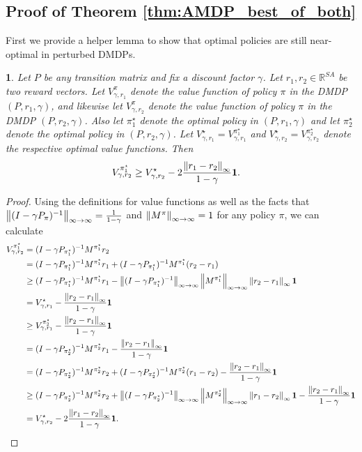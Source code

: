 \documentclass{article}
\theoremstyle{plain}
\theoremstyle{plain}
\newtheorem{lem}[thm]{\protect\lemmaname}
\theoremstyle{remark}
\theoremstyle{plain}
\theoremstyle{plain}
\providecommand{\lemmaname}{Lemma}
\newcommand{\R}{\mathbb{R}}
\newcommand{\pistar}{\pi^\star}
\newcommand{\one}{\mathbf{1}}
\begin{document}
\subsection{Proof of Theorem \ref{thm:AMDP_best_of_both}}
\label{sec:AMDP_best_of_both_pf}

First we provide a helper lemma to show that optimal policies are still near-optimal in perturbed DMDPs.
\begin{lem}
\label{lem:pert_near_optimality}
    Let $P$ be any transition matrix and fix a discount factor $\gamma$. Let $r_1, r_2 \in \R^{SA}$ be two reward vectors. Let $V_{\gamma, r_1}^\pi$ denote the value function of policy $\pi$ in the DMDP $(P, r_1, \gamma)$, and likewise let $V_{\gamma, r_2}^\pi$ denote the value function of policy $\pi$ in the DMDP $(P, r_2, \gamma)$. Also let $\pistar_1$ denote the optimal policy in $(P, r_1, \gamma)$ and let $\pistar_2$ denote the optimal policy in $(P, r_2, \gamma)$. Let $V_{\gamma, r_1}^\star = V_{\gamma, r_1}^{\pistar_1}$ and $V_{\gamma, r_2}^\star = V_{\gamma, r_2}^{\pistar_2}$ denote the respective optimal value functions. Then
    \begin{align*}
        V_{\gamma, r_2}^{\pistar_1} & \geq V_{\gamma, r_2}^{\star} - 2\frac{\infnorm{r_1 - r_2}}{1-\gamma} \one.
    \end{align*}
\end{lem}
\begin{proof}
Using the definitions for value functions as well as the facts that $\left\Vert (I - \gamma P_\pi)^{-1}\right\Vert _{\infty \to \infty} = \frac{1}{1-\gamma}$ and $\left\Vert M^\pi\right\Vert _{\infty \to \infty} = 1$ for any policy $\pi$, we can calculate
    \begin{align*}
        V_{\gamma, r_2}^{\pistar_1} &= (I - \gamma P_{\pistar_1})^{-1} M^{\pistar_1} r_2 \\
        &= (I - \gamma P_{\pistar_1})^{-1} M^{\pistar_1} r_1 + (I - \gamma P_{\pistar_1})^{-1} M^{\pistar_1} (r_2 - r_1) \\
        & \geq (I - \gamma P_{\pistar_1})^{-1} M^{\pistar_1} r_1 - \infinfnorm{(I - \gamma P_{\pistar_1})^{-1}} \infinfnorm{M^{\pistar_1}} \infnorm{ r_2 - r_1} \one \\
        &= V_{\gamma, r_1}^\star - \frac{\infnorm{r_2 - r_1}}{1-\gamma}\one \\
        & \geq V_{\gamma, r_1}^{\pistar_2} - \frac{\infnorm{r_2 - r_1}}{1-\gamma} \one \\
        & = (I - \gamma P_{\pistar_2})^{-1} M^{\pistar_2} r_1 - \frac{\infnorm{r_2 - r_1}}{1-\gamma} \one \\
        & = (I - \gamma P_{\pistar_2})^{-1} M^{\pistar_2} r_2 + (I - \gamma P_{\pistar_2})^{-1} M^{\pistar_2} (r_1 - r_2) - \frac{\infnorm{r_2 - r_1}}{1-\gamma} \one \\ 
        & \geq  (I - \gamma P_{\pistar_2})^{-1} M^{\pistar_2} r_2 + \infinfnorm{(I - \gamma P_{\pistar_2})^{-1} } \infinfnorm{M^{\pistar_2}} \infnorm{ r_1 - r_2} \one - \frac{\infnorm{r_2 - r_1}}{1-\gamma} \one \\
        &= V_{\gamma, r_2}^{\star} - 2\frac{\infnorm{r_1 - r_2}}{1-\gamma} \one.
    \end{align*}
\end{proof}
\end{document}
